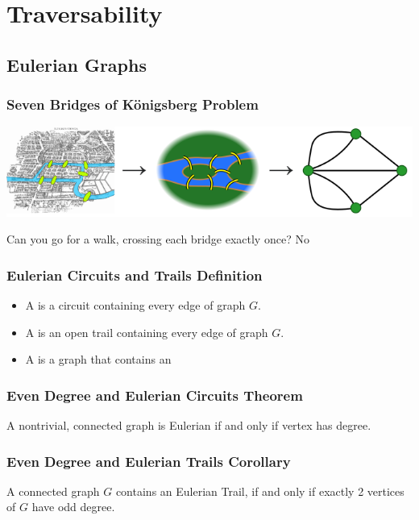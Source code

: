 \section{Traversability}

\subsection{Eulerian Graphs}

\subsubsection*{Seven Bridges of Königsberg Problem}
\begin{center}
    \includegraphics[width=\textwidth]{assets/6.1-bridges.png}
\end{center}
Can you go for a walk, crossing each bridge exactly once? No

\subsubsection*{Eulerian Circuits and Trails Definition}
\begin{itemize}
    \item A  is a circuit containing every edge of graph $G$.
    \item A  is an open trail containing every edge of graph $G$.
    \item A  is a graph that contains an 
\end{itemize}

\subsubsection*{Even Degree and Eulerian Circuits Theorem}
A nontrivial, connected graph is Eulerian if and only if  vertex has  degree.

\subsubsection*{Even Degree and Eulerian Trails Corollary}
A connected graph $G$ contains an Eulerian Trail, if and only if exactly 2 vertices of $G$ have odd degree.

